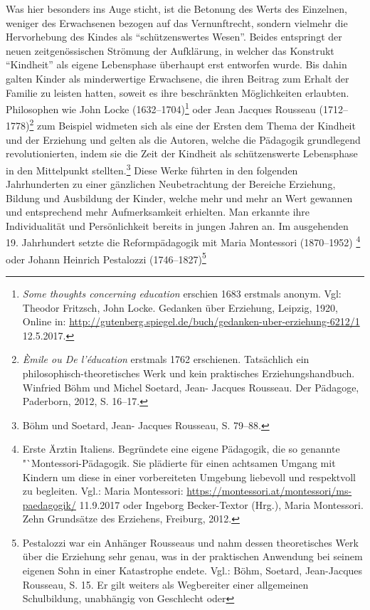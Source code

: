 \documentclass[
    a4paper,
    12pt,
    hyphens,
    chapterprefix=true,
    headheight=33pt,
    footheight=29pt,
    headings=optiontohead,
]{scrartcl}
\begin{document}
{Was hier besonders ins Auge sticht, ist die Betonung des Werts des Einzelnen, weniger des Erwachsenen bezogen auf das Vernunftrecht, sondern vielmehr die Hervorhebung des Kindes als "`schützenswertes Wesen"'. Beides entspringt der neuen zeitgenössischen Strömung der Aufklärung, in welcher das Konstrukt "`Kindheit"' als eigene Lebensphase überhaupt erst entworfen wurde. Bis dahin galten Kinder als minderwertige Erwachsene, die ihren Beitrag zum Erhalt der Familie zu leisten hatten, soweit es ihre beschränkten Möglichkeiten erlaubten.
Philosophen wie John Locke (1632--1704)\footnote{\textit{Some thoughts concerning education} erschien 1683 erstmals anonym. Vgl: Theodor
Fritzsch, John Locke. Gedanken über Erziehung, Leipzig, 1920, Online in: \url{http://gutenberg.spiegel.de/buch/gedanken-uber-erziehung-6212/1}
12.5.2017.} oder Jean Jacques Rousseau (1712--1778)\footnote{\textit{Èmile ou De l'éducation} erstmals 1762 erschienen. Tatsächlich ein philosophisch-theoretisches Werk und kein praktisches Erziehungshandbuch. Winfried Böhm und Michel Soetard, Jean-
Jacques Rousseau. Der Pädagoge, Paderborn, 2012, S. 16--17.} zum Beispiel widmeten
sich als eine der Ersten dem Thema der Kindheit und der Erziehung und gelten als die Autoren, welche die Pädagogik grundlegend revolutionierten,
indem sie die Zeit der Kindheit als schützenswerte Lebensphase in den Mittelpunkt stellten.\footnote{Böhm und Soetard, Jean-
Jacques Rousseau, S. 79--88.} Diese Werke führten in den folgenden Jahrhunderten zu einer gänzlichen Neubetrachtung der
Bereiche Erziehung, Bildung und Ausbildung der Kinder, welche mehr und mehr an Wert gewannen und entsprechend mehr Aufmerksamkeit erhielten. Man
erkannte ihre Individualität und Persönlichkeit bereits in jungen Jahren an. Im ausgehenden 19. Jahrhundert setzte die Reformpädagogik mit Maria
Montessori (1870--1952)
\footnote{Erste Ärztin Italiens. Begründete eine eigene Pädagogik, die so genannte "`Montessori-Pädagogik. Sie plädierte
für einen achtsamen Umgang mit Kindern um diese in einer vorbereiteten Umgebung liebevoll und respektvoll zu begleiten. Vgl.: Maria Montessori:
\url{https://montessori.at/montessori/ms-paedagogik/} 11.9.2017 oder Ingeborg Becker-Textor (Hrg.), Maria Montessori. Zehn Grundsätze des
Erziehens, Freiburg, 2012.}
oder Johann Heinrich Pestalozzi (1746--1827)\footnote{Pestalozzi war ein Anhänger Rousseaus und nahm dessen
theoretisches Werk über die Erziehung sehr genau, was in der praktischen Anwendung bei seinem eigenen Sohn in einer Katastrophe endete. Vgl.:
Böhm, Soetard, Jean-Jacques Rousseau, S. 15. Er gilt weiters als Wegbereiter einer allgemeinen Schulbildung, unabhängig von Geschlecht oder
}}
\end{document}
